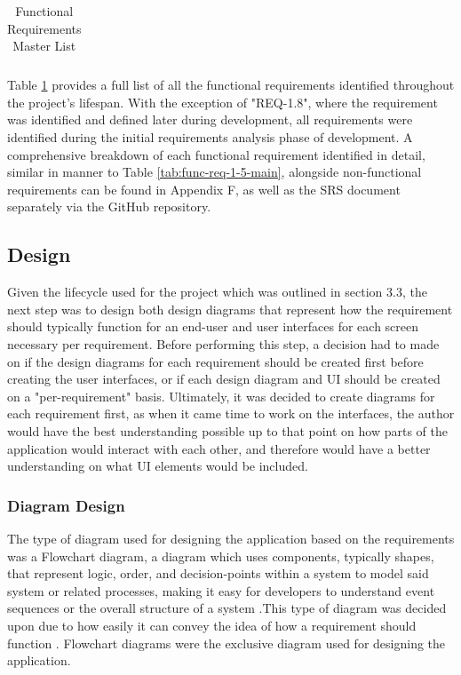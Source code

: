 \documentclass[12pt]{article}
\begin{document}
\begin{table}[H]
{\begin{tabular}{@{}l|ll@{}}
\end{tabular}%
}
\caption{Functional Requirements Master List}
\label{tab:func-req-master-list}
\end{table}

Table \ref{tab:func-req-master-list} provides a full list of all the functional requirements identified throughout the project's lifespan. With the exception of "REQ-1.8", where the requirement
was identified and defined later during development, all requirements were identified during the initial requirements analysis phase of development. A comprehensive breakdown of each functional 
requirement identified in detail, similar in manner to Table \ref{tab:func-req-1-5-main}, alongside non-functional requirements can be found in Appendix F, as well as the SRS document separately 
via the GitHub repository.


\newpage

\subsection{Design}
Given the lifecycle used for the project which was outlined in section 3.3, the next step was to design both design diagrams that represent how the requirement should typically function for an 
end-user and user interfaces for each screen necessary per requirement. Before performing this step, a decision had to made on if the design diagrams for each requirement should be created first
before creating the user interfaces, or if each design diagram and UI should be created on a "per-requirement" basis. Ultimately, it was decided to create diagrams for each requirement first, as
when it came time to work on the interfaces, the author would have the best understanding possible up to that point on how parts of the application would interact with each other, and therefore would
have a better understanding on what UI elements would be included. \newline

\subsubsection{Diagram Design}

The type of diagram used for designing the application based on the requirements was a Flowchart diagram, a diagram which uses components, typically shapes, that represent logic, order, and decision-points within a system
to model said system or related processes, making it easy for developers to understand event sequences or the overall structure of a system \autocite{RefWorks:RefID:166-ghritlahare2025role}.This type 
of diagram was decided upon due to how easily it can convey the idea of how a requirement should function \autocite{RefWorks:RefID:169-xinogalos2013flowchartbased}. Flowchart diagrams were the 
exclusive diagram used for designing the application.
\end{document}
